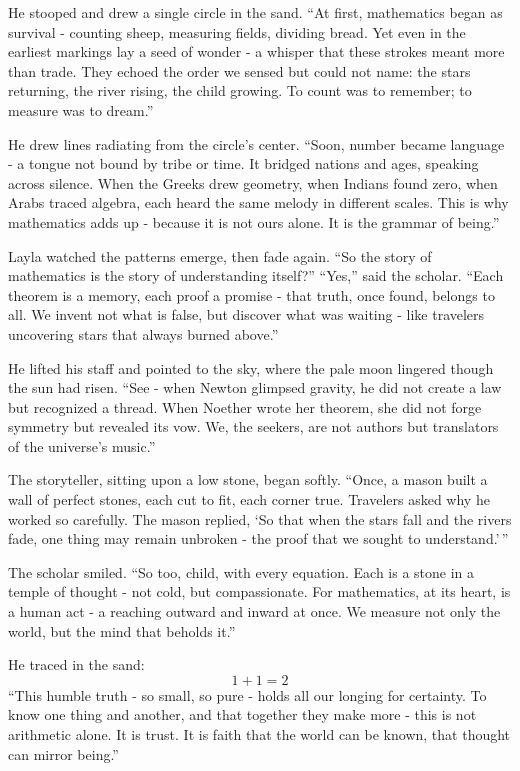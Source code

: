 \documentclass[
  letterpaper,
  DIV=11,
  numbers=noendperiod]{scrreprt}
\begin{document}
He stooped and drew a single circle in the sand. ``At first, mathematics
began as survival - counting sheep, measuring fields, dividing bread.
Yet even in the earliest markings lay a seed of wonder - a whisper that
these strokes meant more than trade. They echoed the order we sensed but
could not name: the stars returning, the river rising, the child
growing. To count was to remember; to measure was to dream.''

He drew lines radiating from the circle's center. ``Soon, number became
language - a tongue not bound by tribe or time. It bridged nations and
ages, speaking across silence. When the Greeks drew geometry, when
Indians found zero, when Arabs traced algebra, each heard the same
melody in different scales. This is why mathematics adds up - because it
is not ours alone. It is the grammar of being.''

Layla watched the patterns emerge, then fade again. ``So the story of
mathematics is the story of understanding itself?'' ``Yes,'' said the
scholar. ``Each theorem is a memory, each proof a promise - that truth,
once found, belongs to all. We invent not what is false, but discover
what was waiting - like travelers uncovering stars that always burned
above.''

He lifted his staff and pointed to the sky, where the pale moon lingered
though the sun had risen. ``See - when Newton glimpsed gravity, he did
not create a law but recognized a thread. When Noether wrote her
theorem, she did not forge symmetry but revealed its vow. We, the
seekers, are not authors but translators of the universe's music.''

The storyteller, sitting upon a low stone, began softly. ``Once, a mason
built a wall of perfect stones, each cut to fit, each corner true.
Travelers asked why he worked so carefully. The mason replied, `So that
when the stars fall and the rivers fade, one thing may remain unbroken -
the proof that we sought to understand.'\,''

The scholar smiled. ``So too, child, with every equation. Each is a
stone in a temple of thought - not cold, but compassionate. For
mathematics, at its heart, is a human act - a reaching outward and
inward at once. We measure not only the world, but the mind that beholds
it.''

He traced in the sand: \[
1 + 1 = 2
\] ``This humble truth - so small, so pure - holds all our longing for
certainty. To know one thing and another, and that together they make
more - this is not arithmetic alone. It is trust. It is faith that the
world can be known, that thought can mirror being.''
\end{document}
